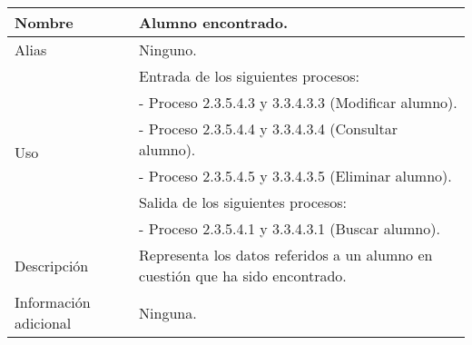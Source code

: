 \begin{center}
  \begin{tabular}{| l | p{9cm} |}
    \hline
    Nombre & \textbf{Alumno encontrado}.\\
    \hline
    Alias & Ninguno.\\
    \hline
    \multirow{6}{*}{Uso} & Entrada de los siguientes procesos:\\
                         & - Proceso 2.3.5.4.3 y 3.3.4.3.3 (Modificar alumno).\\
                         & - Proceso 2.3.5.4.4 y 3.3.4.3.4 (Consultar alumno).\\
                         & - Proceso 2.3.5.4.5 y 3.3.4.3.5 (Eliminar alumno).\\
                         & Salida de los siguientes procesos:\\
                         & - Proceso 2.3.5.4.1 y 3.3.4.3.1  (Buscar alumno).\\
    \hline
    Descripción & Representa los datos referidos a un alumno
                  en cuestión que ha sido encontrado.\\
    \hline
    Información adicional & Ninguna.\\
    \hline
  \end{tabular}
\end{center}
